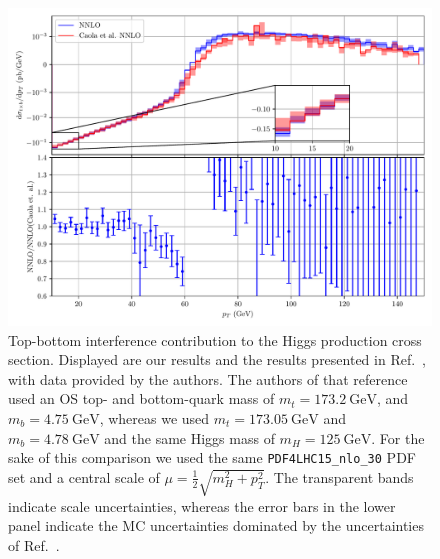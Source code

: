 \begin{figure}[h]
\centering
\includegraphics[width=\figurewidth]{Images/Caola_comparison}
\caption{Top-bottom interference contribution to the Higgs production cross section. Displayed are our results and the results presented in Ref.~\cite{Caola:2018zye}, with data provided by the authors. The authors of that reference used an \acs{OS} top- and bottom-quark mass of $m_t = 173.2\ \mathrm{GeV}$, and $m_b = 4.75\ \mathrm{GeV}$, whereas we used $m_t = 173.05\ \mathrm{GeV}$ and $m_b = 4.78\ \mathrm{GeV}$ and the same Higgs mass of $m_H = 125\ \mathrm{GeV}$. For the sake of this comparison we used the same \texttt{PDF4LHC15\_nlo\_30} \acs{PDF} set and a central scale of $\mu = \frac{1}{2}\sqrt{m_H^2 + p_T^2}$. The transparent bands indicate scale uncertainties, whereas the error bars in the lower panel indicate the \acs{MC} uncertainties dominated by the uncertainties of Ref.~\cite{Caola:2018zye}.}
\label{fig:6:caola_comparison}
\end{figure}

